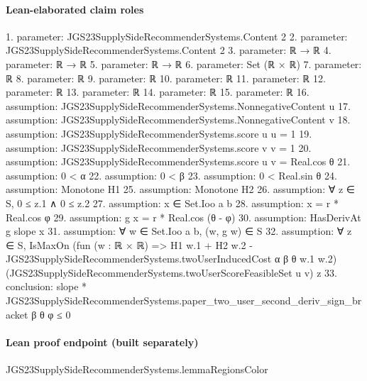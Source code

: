 \documentclass[10pt]{article}
\begin{document}
\paragraph{Lean-elaborated claim roles}\begin{ReviewVerbatim}
1. parameter: JGS23SupplySideRecommenderSystems.Content 2
2. parameter: JGS23SupplySideRecommenderSystems.Content 2
3. parameter: ℝ → ℝ
4. parameter: ℝ → ℝ
5. parameter: ℝ → ℝ
6. parameter: Set (ℝ × ℝ)
7. parameter: ℝ
8. parameter: ℝ
9. parameter: ℝ
10. parameter: ℝ
11. parameter: ℝ
12. parameter: ℝ
13. parameter: ℝ
14. parameter: ℝ
15. parameter: ℝ
16. assumption: JGS23SupplySideRecommenderSystems.NonnegativeContent u
17. assumption: JGS23SupplySideRecommenderSystems.NonnegativeContent v
18. assumption: JGS23SupplySideRecommenderSystems.score u u = 1
19. assumption: JGS23SupplySideRecommenderSystems.score v v = 1
20. assumption: JGS23SupplySideRecommenderSystems.score u v = Real.cos θ
21. assumption: 0 < α
22. assumption: 0 < β
23. assumption: 0 < Real.sin θ
24. assumption: Monotone H1
25. assumption: Monotone H2
26. assumption: ∀ z ∈ S, 0 ≤ z.1 ∧ 0 ≤ z.2
27. assumption: x ∈ Set.Ioo a b
28. assumption: x = r * Real.cos φ
29. assumption: g x = r * Real.cos (θ - φ)
30. assumption: HasDerivAt g slope x
31. assumption: ∀ w ∈ Set.Ioo a b, (w, g w) ∈ S
32. assumption: ∀ z ∈ S,
  IsMaxOn (fun (w : ℝ × ℝ) => H1 w.1 + H2 w.2 - JGS23SupplySideRecommenderSystems.twoUserInducedCost α β θ w.1 w.2)
    (JGS23SupplySideRecommenderSystems.twoUserScoreFeasibleSet u v) z
33. conclusion: slope * JGS23SupplySideRecommenderSystems.paper_two_user_second_deriv_sign_bracket β θ φ ≤ 0
\end{ReviewVerbatim}

\paragraph{Lean proof endpoint (built separately)}\begin{ReviewVerbatim}
JGS23SupplySideRecommenderSystems.lemmaRegionsColor
\end{ReviewVerbatim}
\end{document}
